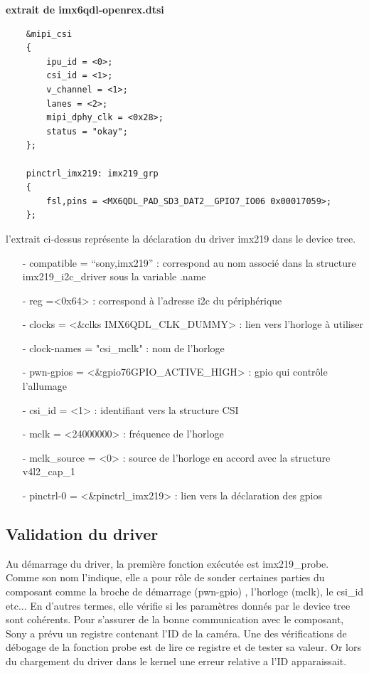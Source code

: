 {\textbf{extrait de imx6qdl-openrex.dtsi}

\begin{lstlisting}
    &mipi_csi 
    {
        ipu_id = <0>;
        csi_id = <1>;
        v_channel = <1>;
        lanes = <2>;
        mipi_dphy_clk = <0x28>;
        status = "okay";
    };

    pinctrl_imx219: imx219_grp
    {
        fsl,pins = <MX6QDL_PAD_SD3_DAT2__GPIO7_IO06 0x00017059>;
    };
\end{lstlisting}

l’extrait ci-dessus représente la déclaration du driver imx219 dans le
device tree.

\begin{itemize}
    \item[-]compatible = “sony,imx219” : correspond au nom associé
    dans la structure imx219\_i2c\_driver sous la variable .name
    \item[-]reg =<0x64> : correspond à l’adresse i2c du périphérique
    \item[-] clocks = <\&clks IMX6QDL\_CLK\_DUMMY> : lien vers l'horloge à utiliser
    \item[-] clock-names = "csi\_mclk" : nom de l’horloge
    \item[-] pwn-gpios = <\&gpio76GPIO\_ACTIVE\_HIGH> : gpio qui contrôle l’allumage
    \item[-] csi\_id = <1> : identifiant vers la structure CSI
    \item[-] mclk = <24000000> : fréquence de l’horloge
    \item[-] mclk\_source = <0> : source de l’horloge en accord avec la structure v4l2\_cap\_1
    \item[-] pinctrl-0 = <\&pinctrl\_imx219> : lien vers la déclaration des gpios
\end{itemize}

\subsection{Validation du driver}

Au démarrage du driver, la première fonction exécutée est imx219\_probe. 
Comme son nom l’indique, elle a pour rôle de sonder certaines parties du composant comme la broche
de démarrage (pwn-gpio) , l’horloge (mclk), le csi\_id etc... En d’autres termes, elle vérifie
si les paramètres donnés par le device tree sont cohérents. Pour s’assurer de la bonne
communication avec le composant, Sony a prévu un registre contenant l’ID de la caméra.
Une des vérifications de débogage de la fonction probe est de lire ce registre et de tester
sa valeur. Or lors du chargement du driver dans le kernel une erreur relative a l’ID
apparaissait. \medskip 

}
